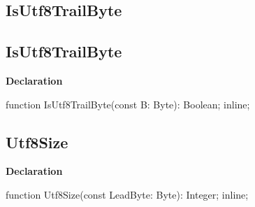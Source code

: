\documentclass{report}
\newif\ifpdf
\begin{document}
\subsection*{\large{\textbf{IsUtf8TrailByte}}\normalsize\hspace{1ex}\hrulefill}
\else
\subsection*{IsUtf8TrailByte}
\fi
\label{PasDoc_Utils-IsUtf8TrailByte}
\begin{list}{}{
\setlength{\itemindent}{0cm}
\setlength{\listparindent}{0cm}
\setlength{\leftmargin}{\evensidemargin}
\addtolength{\leftmargin}{\tmplength}
\settowidth{\labelsep}{X}
\addtolength{\leftmargin}{\labelsep}
\setlength{\labelwidth}{\tmplength}
}
\item[\textbf{Declaration}\hfill]
\ifpdf
\begin{flushleft}
\fi
\begin{ttfamily}
function IsUtf8TrailByte(const B: Byte): Boolean; inline;\end{ttfamily}

\ifpdf
\end{flushleft}
\fi

\end{list}
\ifpdf
\subsection*{\large{\textbf{Utf8Size}}\normalsize\hspace{1ex}\hrulefill}
\else
\subsection*{Utf8Size}
\fi
\label{PasDoc_Utils-Utf8Size}
\begin{list}{}{
\setlength{\itemindent}{0cm}
\setlength{\listparindent}{0cm}
\setlength{\leftmargin}{\evensidemargin}
\addtolength{\leftmargin}{\tmplength}
\settowidth{\labelsep}{X}
\addtolength{\leftmargin}{\labelsep}
\setlength{\labelwidth}{\tmplength}
}
\item[\textbf{Declaration}\hfill]
\ifpdf
\begin{flushleft}
\fi
\begin{ttfamily}
function Utf8Size(const LeadByte: Byte): Integer; inline;\end{ttfamily}

\ifpdf
\end{flushleft}
\fi

\end{list}
\ifpdf
\end{document}
